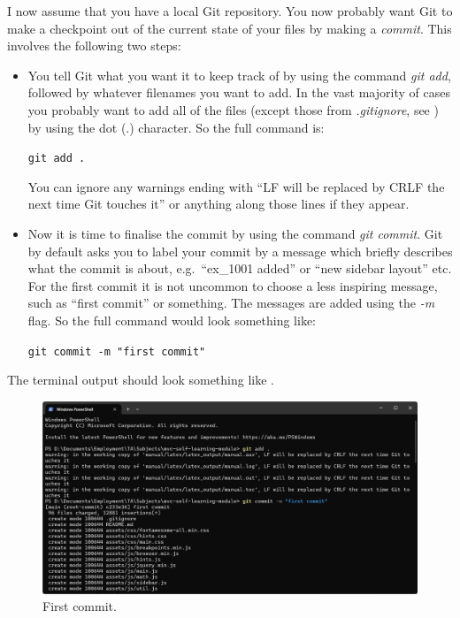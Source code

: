 \documentclass[a4paper,10pt]{article}
\begin{document}
I now assume that you have a local Git repository. You now probably want Git to make a checkpoint out of the current state of your files by making a \emph{commit}. This involves the following two steps:
\begin{itemize}
    \item You tell Git what you want it to keep track of by using the command \emph{git add}, followed by whatever filenames you want to add. In the vast majority of cases you probably want to add all of the files (except those from \emph{.gitignore}, see ) by using the dot (.) character. So the full command is:

    \texttt{git add .}

    You can ignore any warnings ending with ``LF will be replaced by CRLF the next time Git touches it'' or anything along those lines if they appear.

    \item Now it is time to finalise the commit by using the command \emph{git commit}. Git by default asks you to label your commit by a message which briefly describes what the commit is about, e.g.\ ``ex\_1001 added'' or ``new sidebar layout'' etc. For the first commit it is not uncommon to choose a less inspiring message, such as ``first commit'' or something. The messages are added using the \emph{-m} flag. So the full command would look something like:

    \texttt{git commit -m "first commit"}    
\end{itemize}
The terminal output should look something like .

\begin{figure}[htbp]
    \centering
    \includegraphics[width=\textwidth]{first_commit.png}
    \caption{First commit.}
    \label{fig:first_commit}   
\end{figure}
\end{document}
